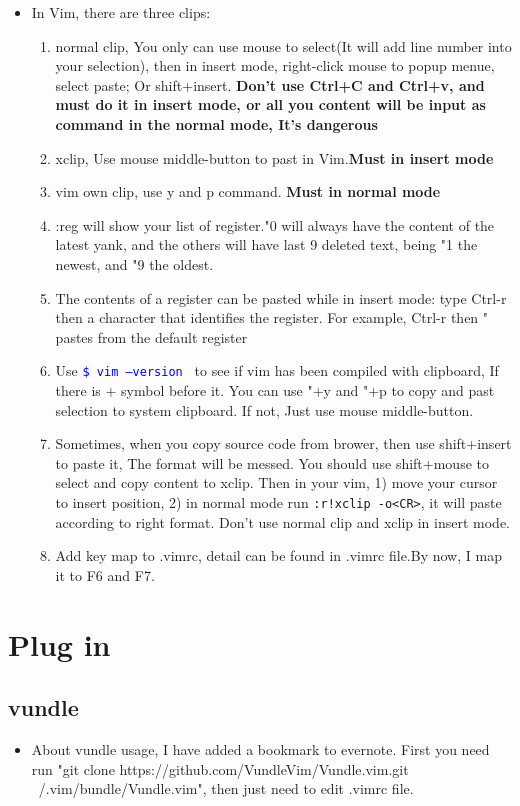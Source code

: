 \documentclass[a4paper,12pt,twoside]{book}
\newcommand{\linuxcommand}[1]{\texttt{\textcolor{blue}{\$ #1 \Pisymbol{psy}{191}}}}
\begin{document}
\begin{itemize}
\begin{itemize}
\begin{center}
\begin{tabular}{c|c}
			\end{tabular}
	\end{center}
		\item In Vim, there are three clips:
				\begin{enumerate}
						\item normal clip, You only can use mouse to select(It will add line number into your selection), then in insert mode, right-click mouse to popup menue, select paste; Or shift+insert. \textbf{Don't use Ctrl+C and Ctrl+v, and must do it in insert mode, or all you content will be input as command in the normal mode, It's dangerous}
						\item xclip, Use mouse middle-button to past in Vim.\textbf{Must in insert mode}
						\item vim own clip, use y and p command. \textbf{Must in normal mode}
						\item :reg will show your list of register."0 will always have the content of the latest yank, and the others will have last 9 deleted text, being "1 the newest, and "9 the oldest.
						\item The contents of a register can be pasted while in insert mode: type Ctrl-r then a character that identifies the register. For example, Ctrl-r then " pastes from the default register
						\item Use \linuxcommand{vim --version} to see if vim has been compiled with clipboard, If there is + symbol before it. You can use "+y and "+p to copy and past selection to system clipboard. If not, Just use mouse middle-button.
						\item Sometimes, when you copy source code from brower, then use shift+insert to paste it, The format will be messed. You should use shift+mouse to select and copy content to xclip. Then in your vim, 1) move your cursor to insert position, 2) in normal mode run \verb=:r!xclip -o<CR>=, it will paste according to right format. Don't use normal clip and xclip in insert mode.
						\item Add key map to .vimrc, detail can be found in .vimrc file.By now, I map it to F6 and F7. 


				\end{enumerate}

\end{itemize}

\section{Plug in}
\subsection{vundle}
\begin{itemize}
		\item About vundle usage, I have added a bookmark to evernote. First you need run "git clone https://github.com/VundleVim/Vundle.vim.git ~/.vim/bundle/Vundle.vim", then just need to edit .vimrc file.  


\end{itemize}
\end{itemize}
\end{document}
